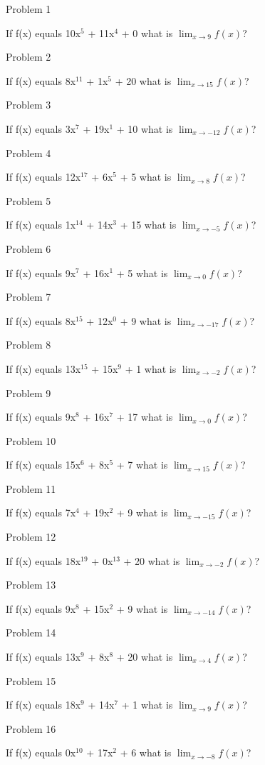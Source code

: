 \documentclass{article}
\begin{document}
Problem 1

If f(x) equals 10x$^{5}$ + 11x$^{4}$ + 0 what is $\lim_{x\to 9} f(x) $?

Problem 2

If f(x) equals 8x$^{11}$ + 1x$^{5}$ + 20 what is $\lim_{x\to 15} f(x) $?

Problem 3

If f(x) equals 3x$^{7}$ + 19x$^{1}$ + 10 what is $\lim_{x\to -12} f(x) $?

Problem 4

If f(x) equals 12x$^{17}$ + 6x$^{5}$ + 5 what is $\lim_{x\to 8} f(x) $?

Problem 5

If f(x) equals 1x$^{14}$ + 14x$^{3}$ + 15 what is $\lim_{x\to -5} f(x) $?

Problem 6

If f(x) equals 9x$^{7}$ + 16x$^{1}$ + 5 what is $\lim_{x\to 0} f(x) $?

Problem 7

If f(x) equals 8x$^{15}$ + 12x$^{0}$ + 9 what is $\lim_{x\to -17} f(x) $?

Problem 8

If f(x) equals 13x$^{15}$ + 15x$^{9}$ + 1 what is $\lim_{x\to -2} f(x) $?

Problem 9

If f(x) equals 9x$^{8}$ + 16x$^{7}$ + 17 what is $\lim_{x\to 0} f(x) $?

Problem 10

If f(x) equals 15x$^{6}$ + 8x$^{5}$ + 7 what is $\lim_{x\to 15} f(x) $?

Problem 11

If f(x) equals 7x$^{4}$ + 19x$^{2}$ + 9 what is $\lim_{x\to -15} f(x) $?

Problem 12

If f(x) equals 18x$^{19}$ + 0x$^{13}$ + 20 what is $\lim_{x\to -2} f(x) $?

Problem 13

If f(x) equals 9x$^{8}$ + 15x$^{2}$ + 9 what is $\lim_{x\to -14} f(x) $?

Problem 14

If f(x) equals 13x$^{9}$ + 8x$^{8}$ + 20 what is $\lim_{x\to 4} f(x) $?

Problem 15

If f(x) equals 18x$^{9}$ + 14x$^{7}$ + 1 what is $\lim_{x\to 9} f(x) $?

Problem 16

If f(x) equals 0x$^{10}$ + 17x$^{2}$ + 6 what is $\lim_{x\to -8} f(x) $?
\end{document}
